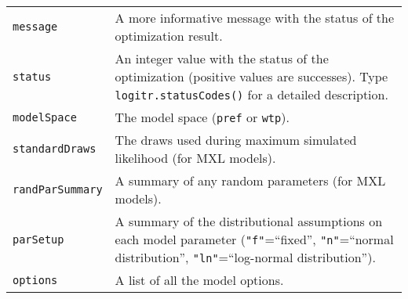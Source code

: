 \documentclass[article]{jss}
\begin{document}
\begin{longtable}[]{@{}ll@{}}
\begin{minipage}[t]{0.21\columnwidth}\raggedright
\texttt{message}\strut
\end{minipage} & \begin{minipage}[t]{0.73\columnwidth}\raggedright
A more informative message with the status of the optimization
result.\strut
\end{minipage}\tabularnewline
\begin{minipage}[t]{0.21\columnwidth}\raggedright
\texttt{status}\strut
\end{minipage} & \begin{minipage}[t]{0.73\columnwidth}\raggedright
An integer value with the status of the optimization (positive values
are successes). Type \texttt{logitr.statusCodes()} for a detailed
description.\strut
\end{minipage}\tabularnewline
\begin{minipage}[t]{0.21\columnwidth}\raggedright
\texttt{modelSpace}\strut
\end{minipage} & \begin{minipage}[t]{0.73\columnwidth}\raggedright
The model space (\texttt{\textquotesingle{}pref\textquotesingle{}} or
\texttt{\textquotesingle{}wtp\textquotesingle{}}).\strut
\end{minipage}\tabularnewline
\begin{minipage}[t]{0.21\columnwidth}\raggedright
\texttt{standardDraws}\strut
\end{minipage} & \begin{minipage}[t]{0.73\columnwidth}\raggedright
The draws used during maximum simulated likelihood (for MXL
models).\strut
\end{minipage}\tabularnewline
\begin{minipage}[t]{0.21\columnwidth}\raggedright
\texttt{randParSummary}\strut
\end{minipage} & \begin{minipage}[t]{0.73\columnwidth}\raggedright
A summary of any random parameters (for MXL models).\strut
\end{minipage}\tabularnewline
\begin{minipage}[t]{0.21\columnwidth}\raggedright
\texttt{parSetup}\strut
\end{minipage} & \begin{minipage}[t]{0.73\columnwidth}\raggedright
A summary of the distributional assumptions on each model parameter
(\texttt{"f"}=``fixed'', \texttt{"n"}=``normal distribution'',
\texttt{"ln"}=``log-normal distribution'').\strut
\end{minipage}\tabularnewline
\begin{minipage}[t]{0.21\columnwidth}\raggedright
\texttt{options}\strut
\end{minipage} & \begin{minipage}[t]{0.73\columnwidth}\raggedright
A list of all the model options.\strut
\end{minipage}\tabularnewline
\bottomrule
\end{longtable}
\end{document}
